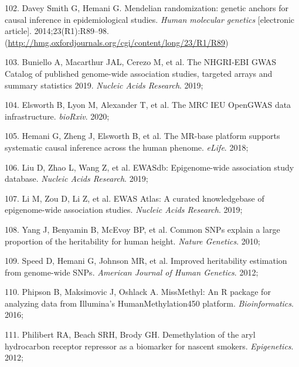 \documentclass[11pt,twoside]{bristolthesis}
\newenvironment{cslreferences}%
  {}%
  {\par}
\begin{document}
\begin{cslreferences}
\leavevmode\hypertarget{ref-DaveySmith2014}{}%
102. Davey Smith G, Hemani G. Mendelian randomization: genetic anchors for causal inference in epidemiological studies. \emph{Human molecular genetics} {[}electronic article{]}. 2014;23(R1):R89--98. (\url{http://hmg.oxfordjournals.org/cgi/content/long/23/R1/R89})

\leavevmode\hypertarget{ref-Buniello2019}{}%
103. Buniello A, Macarthur JAL, Cerezo M, et al. The NHGRI-EBI GWAS Catalog of published genome-wide association studies, targeted arrays and summary statistics 2019. \emph{Nucleic Acids Research}. 2019;

\leavevmode\hypertarget{ref-Elsworth2020}{}%
104. Elsworth\hspace{0pt} B, Lyon\hspace{0pt} M, Alexander\hspace{0pt} T, et al. The MRC IEU OpenGWAS data infrastructure. \emph{bioRxiv}. 2020;

\leavevmode\hypertarget{ref-Hemani2018}{}%
105. Hemani G, Zheng J, Elsworth B, et al. The MR-base platform supports systematic causal inference across the human phenome. \emph{eLife}. 2018;

\leavevmode\hypertarget{ref-Liu2019}{}%
106. Liu D, Zhao L, Wang Z, et al. EWASdb: Epigenome-wide association study database. \emph{Nucleic Acids Research}. 2019;

\leavevmode\hypertarget{ref-Li2019}{}%
107. Li M, Zou D, Li Z, et al. EWAS Atlas: A curated knowledgebase of epigenome-wide association studies. \emph{Nucleic Acids Research}. 2019;

\leavevmode\hypertarget{ref-Yang2010}{}%
108. Yang J, Benyamin B, McEvoy BP, et al. Common SNPs explain a large proportion of the heritability for human height. \emph{Nature Genetics}. 2010;

\leavevmode\hypertarget{ref-Speed2012}{}%
109. Speed D, Hemani G, Johnson MR, et al. Improved heritability estimation from genome-wide SNPs. \emph{American Journal of Human Genetics}. 2012;

\leavevmode\hypertarget{ref-Phipson2016}{}%
110. Phipson B, Maksimovic J, Oshlack A. MissMethyl: An R package for analyzing data from Illumina's HumanMethylation450 platform. \emph{Bioinformatics}. 2016;

\leavevmode\hypertarget{ref-Philibert2012}{}%
111. Philibert RA, Beach SRH, Brody GH. Demethylation of the aryl hydrocarbon receptor repressor as a biomarker for nascent smokers. \emph{Epigenetics}. 2012;


\end{cslreferences}
\end{document}
